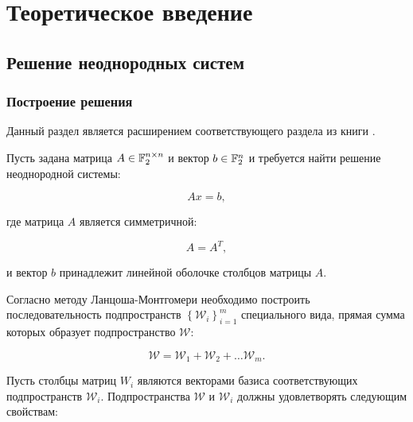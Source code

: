 \chapter{Теоретическое введение} \label{chapter:theoretical_introduction}

\section{Решение неоднородных систем} \label{section:ti:non_homogeneous_systems}

\subsection{Построение решения} \label{subsection:ti:nhs:finding_solution}

Данный раздел является расширением соответствующего раздела из книги \cite[с.~44--50]{Zamarashkin}.

Пусть задана матрица $A \in \mathbb{F}^{n \times n}_2$ и вектор $b \in \mathbb{F}^{n}_2$ и требуется найти решение неоднородной системы:

\begin{equation} \label{equation:ti:nhs:non_homogeneous_equation_system}
	Ax = b,
\end{equation}

где матрица $A$ является симметричной:

$$
	A = A^T,
$$

и вектор $b$ принадлежит линейной оболочке столбцов матрицы $A$.

Согласно методу Ланцоша-Монтгомери \cite{Montgomery} необходимо построить последовательность подпространств
$ \left \{ \mathcal W_i \right \} _{i=1}^m$ специального вида, прямая сумма которых образует подпространство $\mathcal W$:

$$
	\mathcal W = \mathcal W_1 + \mathcal W_2 + \dots \mathcal W_m.
$$

Пусть столбцы матриц $W_i$ являются векторами базиса соответствующих подпространств $\mathcal W_i$. Подпространства $\mathcal W$
и $\mathcal W_i$ должны удовлетворять следующим свойствам:

